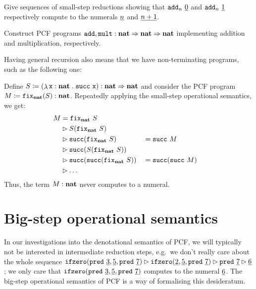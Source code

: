 \begin{exercise}\label{exer:small-step-addition}
  Give sequences of small-step reductions showing that
  \(\pcfadd_n \, \numeral 0\) and \(\pcfadd_n \, \numeral 1\) respectively
  compute to the numerals \(\numeral n\) and \(\numeral {n+1}\).
\end{exercise}

\begin{exercise}\label{exer:pcf-add-mult}
  Construct PCF programs
  \(\pcfadd,\pcffont{mult} : \pcfnat \pcffun \pcfnat \pcffun \pcfnat\)
  implementing addition and multiplication, respectively.
\end{exercise}

Having general recursion also means that we have non-terminating programs, such
as the following one:

\begin{example}\label{exam:non-termination}
  Define
  \(S \coloneqq \pa*{\lambdadot{\var x : \pcfnat}{\pcfsuc \, \var x}} : \pcfnat
  \pcffun \pcfnat\) and consider the PCF program
  \(M \coloneqq \pcffix_{\pcfnat}(S) : \pcfnat\).  Repeatedly applying the
  small-step operational semantics, we get:
  \begin{alignat*}{3}
    M &= \pcffix_{\pcfnat} \, S \\
    &\smallstep
       S(\pcffix_{\pcfnat} \, S)\\
    &\smallstep
      \pcfsuc(\pcffix_{\pcfnat} \, S)
    &&= \pcfsuc \, M \\
    &\smallstep
      \pcfsuc\pa*{S\pa*{\pcffix_{\pcfnat} \, S}} \\
    &\smallstep
      \pcfsuc\pa*{\pcfsuc\pa*{\pcffix_{\pcfnat} \, S}}
    &&= \pcfsuc\pa*{\pcfsuc\, M} \\
    &\smallstep \dots
  \end{alignat*}
  Thus, the term \(M : \pcfnat\) never computes to a numeral.
\end{example}

\section{Big-step operational semantics}

In our investigations into the denotational semantics of PCF, we will typically
not be interested in intermediate reduction steps, e.g.\ we don't really care
about the whole sequence
\({\pcfifz(\pcfpred\,\numeral{3},\numeral{5},\pcfpred\,\numeral{7})} \smallstep
{\pcfifz(\numeral{2},\numeral{5},\pcfpred\,\numeral{7})} \smallstep
{\pcfpred\,\numeral{7}} \smallstep {\numeral{6}}\); we only care that
\(\pcfifz(\pcfpred\,\numeral{3},\numeral{5},\pcfpred\,\numeral{7})\) computes to
the numeral \(\numeral{6}\).
%
The big-step operational semantics of PCF is a way of formalising this
desideratum.

